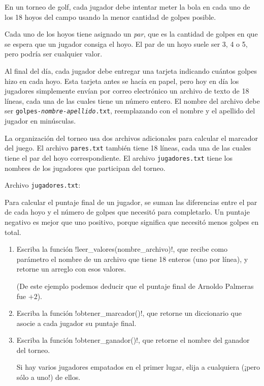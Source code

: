 En un torneo de golf,
cada jugador debe intentar meter la bola
en cada uno de los 18 hoyos del campo
usando la menor cantidad de golpes posible.

Cada uno de los hoyos tiene asignado un \emph{par},
que es la cantidad de golpes
en que se espera que un jugador consiga el hoyo.
El par de un hoyo suele ser 3, 4 o 5,
pero podría ser cualquier valor.

Al final del día,
cada jugador debe entregar una tarjeta
indicando cuántos golpes hizo en cada hoyo.
Esta tarjeta antes se hacía en papel,
pero hoy en día los jugadores simplemente envían por correo electrónico
un archivo de texto de 18 líneas,
cada una de las cuales tiene un número entero.
El nombre del archivo debe ser
\texttt{golpes-\textit{nombre}-\textit{apellido}.txt},
reemplazando con el nombre y el apellido del jugador en minúsculas.

\begin{minipage}[t]{.65\textwidth}
  La organización del torneo usa dos archivos adicionales
  para calcular el marcador del juego.
  El archivo \texttt{pares.txt} también tiene 18 líneas,
  cada una de las cuales tiene el par del hoyo correspondiente.
  El archivo \texttt{jugadores.txt} tiene los nombres de los jugadores
  que participan del torneo.
\end{minipage}
\hfill
\begin{minipage}[t]{.30\textwidth}
  Archivo \texttt{jugadores.txt}:
  
\end{minipage}

Para calcular el puntaje final de un jugador,
se suman las diferencias entre el par de cada hoyo
y el número de golpes que necesitó para completarlo.
Un puntaje negativo es mejor que uno positivo,
porque significa que necesitó menos golpes en total.

\begin{enumerate}[leftmargin=0pt,label=\emph{\alph*})]

  \item
    Escriba la función \li!leer_valores(nombre_archivo)!,
    que recibe como parámetro el nombre de un archivo
    que tiene 18 enteros (uno por línea),
    y retorne un arreglo con esos valores.
    

    (De este ejemplo podemos deducir
    que el puntaje final de Arnoldo Palmeras fue \(+2\)).

  \item
    Escriba la función \li!obtener_marcador()!,
    que retorne un diccionario
    que asocie a cada jugador su puntaje final.
    

  \item
    Escriba la función \li!obtener_ganador()!,
    que retorne el nombre del ganador del torneo.
    

    Si hay varios jugadores empatados en el primer lugar,
    elija a cualquiera (¡pero sólo a uno!) de ellos.

\end{enumerate}

